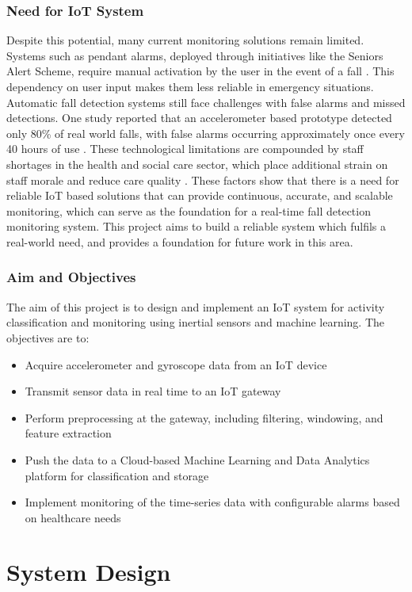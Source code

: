 \documentclass[conference]{IEEEtran}
\begin{document}
\subsubsection{Need for IoT System}
Despite this potential, many current monitoring solutions remain limited. Systems such as pendant alarms, deployed through initiatives like the Seniors Alert Scheme, require manual activation by the user in the event of a fall \cite{b2}. This dependency on user input makes them less reliable in emergency situations. Automatic fall detection systems still face challenges with false alarms and missed detections. One study reported that an accelerometer based prototype detected only 80\% of real world falls, with false alarms occurring approximately once every 40 hours of use \cite{b3}. These technological limitations are compounded by staff shortages in the health and social care sector, which place additional strain on staff morale and reduce care quality \cite{b4}. These factors show that there is a need for reliable IoT based solutions that can provide continuous, accurate, and scalable monitoring, which can serve as the foundation for a real-time fall detection monitoring system. This project aims to build a reliable system which fulfils a real-world need, and provides a foundation for future work in this area.

\subsubsection{Aim and Objectives}\label{AO}
The aim of this project is to design and implement an IoT system for activity classification and monitoring using inertial sensors and machine learning. The objectives are to:
\begin{itemize}
	\item Acquire accelerometer and gyroscope data from an IoT device
	\item Transmit sensor data in real time to an IoT gateway
	\item Perform preprocessing at the gateway, including filtering, windowing, and feature extraction
	\item Push the data to a Cloud-based Machine Learning and Data Analytics platform for classification and storage
	\item Implement monitoring of the time-series data with configurable alarms based on healthcare needs
\end{itemize}

\section{System Design}
\end{document}
